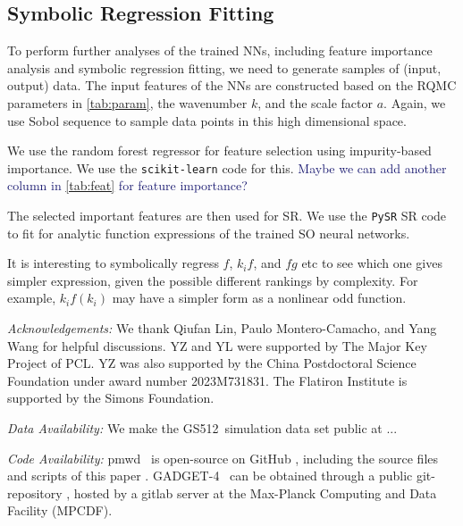 \documentclass[modern, trackchanges, dvipsnames]{aastex631}
\newcommand{\pmwd}{{\usefont{T1}{nova}{m}{sl}pmwd}}
\newcommand{\GADGET}{{{\fontsize{10pt}{12pt}\selectfont GADGET}-4}}
\newcommand{\GSDATA}{{GS512}}
\newcommand{\YL}[1]{\textcolor{Bittersweet}{#1}}
\newcommand{\YZ}[1]{\textcolor{MidnightBlue}{#1}}
\begin{document}
\vspace{1em}
\subsection{Symbolic Regression Fitting}

To perform further analyses of the trained NNs, including feature
importance analysis and symbolic regression fitting, we need to generate
samples of (input, output) data.
The input features of the NNs are constructed based on the RQMC
parameters in \autoref{tab:param}, the wavenumber $k$, and the scale
factor $a$.
Again, we use Sobol sequence to sample data points in this high
dimensional space.

We use the random forest regressor for feature selection using
impurity-based importance.
We use the \texttt{scikit-learn} \citep{scikit-learn} code for this.
\YZ{Maybe we can add another column in \autoref{tab:feat} for feature
importance?}

The selected important features are then used for SR.
We use the \texttt{PySR} \citep{PySR} SR code to fit for analytic
function expressions of the trained SO neural networks.

\YL{It is interesting to symbolically regress $f$, $k_i f$, and $f g$
etc to see which one gives simpler expression, given the possible
different rankings by complexity.
For example, $k_i f(k_i)$ may have a simpler form as a nonlinear odd
function.}


\vspace{1em}
\textit{\large Acknowledgements:}
We thank Qiufan Lin, Paulo Montero-Camacho, and Yang Wang for helpful
discussions.
YZ and YL were supported by The Major Key Project of PCL.
YZ was also supported by the China Postdoctoral Science Foundation under
award number 2023M731831.
The Flatiron Institute is supported by the Simons Foundation.


\vspace{1em}
\textit{\large Data Availability:}
We make the \GSDATA\ simulation data set public at ...


\vspace{1em}
\textit{\large Code Availability:}
\pmwd\ \citep{Li2022b} is open-source on GitHub
\href{https://github.com/eelregit/pmwd}{\faGithub}, including the source
files and scripts of this paper
\href{https://github.com/eelregit/pmwd/tree/master/docs/papers/sto}{\faFile}.
\GADGET\ \citep{GADGET-4} can be obtained through a public
git-repository \href{http://gitlab.mpcdf.mpg.de/vrs/gadget4}{\faGitlab},
hosted by a gitlab server at the Max-Planck Computing and Data Facility
(MPCDF).
\end{document}
